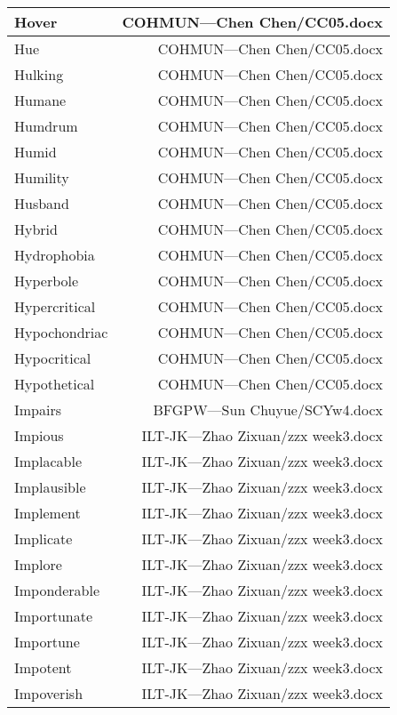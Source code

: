 \documentclass{article}
\begin{document}
\begin{center}
\begin{longtable}{|l|r|}
Hover  &  COHMUN---Chen Chen/CC05.docx\\  
\hline
Hue  &  COHMUN---Chen Chen/CC05.docx\\  
\hline
Hulking  &  COHMUN---Chen Chen/CC05.docx\\  
\hline
Humane  &  COHMUN---Chen Chen/CC05.docx\\  
\hline
Humdrum  &  COHMUN---Chen Chen/CC05.docx\\  
\hline
Humid  &  COHMUN---Chen Chen/CC05.docx\\  
\hline
Humility  &  COHMUN---Chen Chen/CC05.docx\\  
\hline
Husband  &  COHMUN---Chen Chen/CC05.docx\\  
\hline
Hybrid  &  COHMUN---Chen Chen/CC05.docx\\  
\hline
Hydrophobia  &  COHMUN---Chen Chen/CC05.docx\\  
\hline
Hyperbole  &  COHMUN---Chen Chen/CC05.docx\\  
\hline
Hypercritical  &  COHMUN---Chen Chen/CC05.docx\\  
\hline
Hypochondriac  &  COHMUN---Chen Chen/CC05.docx\\  
\hline
Hypocritical  &  COHMUN---Chen Chen/CC05.docx\\  
\hline
Hypothetical  &  COHMUN---Chen Chen/CC05.docx\\  
\hline
Impairs  &  BFGPW---Sun Chuyue/SCYw4.docx\\  
\hline
Impious  &  ILT-JK---Zhao Zixuan/zzx week3.docx\\  
\hline
Implacable  &  ILT-JK---Zhao Zixuan/zzx week3.docx\\  
\hline
Implausible  &  ILT-JK---Zhao Zixuan/zzx week3.docx\\  
\hline
Implement  &  ILT-JK---Zhao Zixuan/zzx week3.docx\\  
\hline
Implicate  &  ILT-JK---Zhao Zixuan/zzx week3.docx\\  
\hline
Implore  &  ILT-JK---Zhao Zixuan/zzx week3.docx\\  
\hline
Imponderable  &  ILT-JK---Zhao Zixuan/zzx week3.docx\\  
\hline
Importunate  &  ILT-JK---Zhao Zixuan/zzx week3.docx\\  
\hline
Importune  &  ILT-JK---Zhao Zixuan/zzx week3.docx\\  
\hline
Impotent  &  ILT-JK---Zhao Zixuan/zzx week3.docx\\  
\hline
Impoverish  &  ILT-JK---Zhao Zixuan/zzx week3.docx\\  

\end{longtable}
\end{center}
\end{document}
